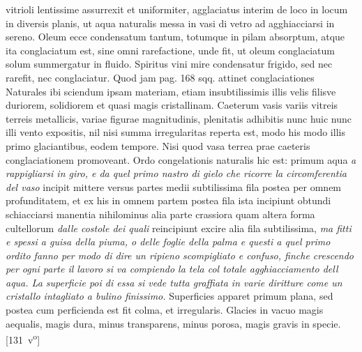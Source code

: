 vitrioli\protect{} lentissime assurrexit et uniformiter,  agglaciatus interim de loco in locum in diversis planis, ut aqua naturalis  messa in vasi di vetro ad agghiacciarsi in sereno. Oleum ecce condensatum tantum, totumque in pilam\protect{} absorptum, atque ita conglaciatum est, sine omni rarefactione,  unde fit, ut oleum conglaciatum solum summergatur in fluido. Spiritus vini\protect{} mire condensatur frigido, sed nec rarefit, nec conglaciatur. Quod  jam pag. 168 sqq. attinet conglaciationes Naturales ibi sciendum  ipsam materiam, etiam insubtilissimis illis velis filisve duriorem, solidiorem et quasi magis cristallinam. Caeterum vasis variis vitreis terreis metallicis,  variae figurae magnitudinis, plenitatis adhibitis nunc huic nunc illi vento  expositis, nil nisi summa irregularitas reperta est, modo his modo illis primo  glaciantibus, eodem tempore. Nisi quod vasa terrea prae caeteris conglaciationem promoveant. Ordo congelationis naturalis hic est: primum  aqua  \textit{a rappigliarsi in giro, e da quel primo nastro  di gielo che ricorre la circomferentia del vaso} incipit mittere versus partes  medii subtilissima fila postea per omnem profunditatem, et ex his in omnem  partem postea fila ista incipiunt obtundi schiacciarsi manentia nihilominus   alia parte crassiora quam altera forma cultellorum \textit{dalle costole dei  quali }reincipiunt excire alia fila subtilissima, \textit{ma fitti e spessi a guisa della  piuma, o delle foglie della palma e questi a quel primo ordito fanno  per modo di dire un ripieno scompigliato e confuso, finche crescendo per ogni  parte il lavoro si va compiendo la tela col totale agghiacciamento dell aqua.  La superficie poi di essa si vede tutta graffiata in varie diritture come  un cristallo intagliato a bulino finissimo.} Superficies apparet primum plana,  sed postea cum perficienda est fit colma, et irregularis. Glacies in vacuo magis  aequalis, magis dura, minus transparens, minus porosa, magis gravis in specie. [131~v\textsuperscript{o}]